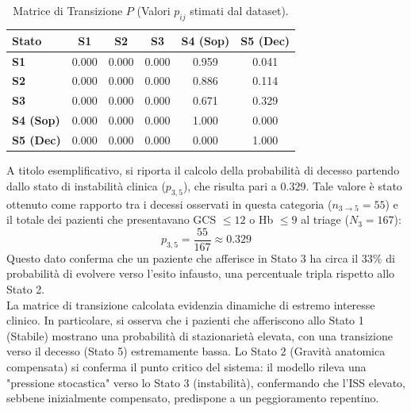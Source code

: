 \documentclass[11pt, oneside, noexaminfo]{sapthesis}   	%
\begin{document}
\begin{table}[h]
\centering
\caption{Matrice di Transizione $P$ (Valori $p_{ij}$ stimati dal dataset).}
\label{tab:matrice_P_finale}
\begin{tabular}{|l|ccccc|}
\hline
\textbf{Stato} & \textbf{S1} & \textbf{S2} & \textbf{S3} & \textbf{S4 (Sop)} & \textbf{S5 (Dec)} \\ \hline
\textbf{S1} & 0.000 & 0.000 & 0.000 & 0.959 & 0.041 \\
\textbf{S2} & 0.000 & 0.000 & 0.000 & 0.886 & 0.114 \\
\textbf{S3} & 0.000 & 0.000 & 0.000 & 0.671 & 0.329 \\
\textbf{S4 (Sop)} & 0.000 & 0.000 & 0.000 & 1.000 & 0.000 \\
\textbf{S5 (Dec)} & 0.000 & 0.000 & 0.000 & 0.000 & 1.000 \\ \hline
\end{tabular}
\end{table}

A titolo esemplificativo, si riporta il calcolo della probabilità di decesso partendo dallo stato di instabilità clinica ($p_{3,5}$), che risulta pari a 0.329. Tale valore è stato ottenuto come rapporto tra i decessi osservati in questa categoria ($n_{3 \rightarrow 5} = 55$) e il totale dei pazienti che presentavano GCS $\leq 12$ o Hb $\leq 9$ al triage ($N_3 = 167$):
\begin{equation}
p_{3,5} = \frac{55}{167} \approx 0.329
\end{equation}
Questo dato conferma che un paziente che afferisce in Stato 3 ha circa il 33\% di probabilità di evolvere verso l'esito infausto, una percentuale tripla rispetto allo Stato 2.\\

La matrice di transizione calcolata evidenzia dinamiche di estremo interesse clinico. In particolare, si osserva che i pazienti che afferiscono allo Stato 1 (Stabile) mostrano una probabilità di stazionarietà elevata, con una transizione verso il decesso (Stato 5) estremamente bassa. Lo Stato 2 (Gravità anatomica compensata) si conferma il punto critico del sistema: il modello rileva una "pressione stocastica" verso lo Stato 3 (instabilità), confermando che l'ISS elevato, sebbene inizialmente compensato, predispone a un peggioramento repentino.
\end{document}
